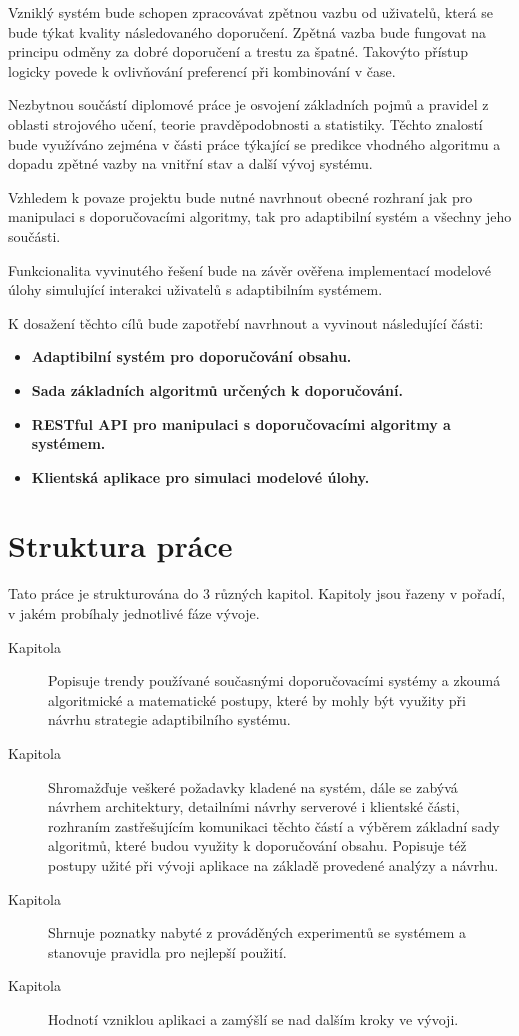 \documentclass[thesis=M,czech]{FITthesis}[2014/05/07]
\begin{document}
\begin{introduction}
	Vzniklý systém bude schopen zpracovávat zpětnou vazbu od uživatelů, která se bude týkat kvality následovaného doporučení. Zpětná vazba bude fungovat na principu odměny za dobré doporučení a trestu za špatné. Takovýto přístup logicky povede k ovlivňování preferencí při kombinování v čase.
		
	Nezbytnou součástí diplomové práce je osvojení základních pojmů a pravidel z oblasti strojového učení, teorie pravděpodobnosti a statistiky. Těchto znalostí bude využíváno zejména v části práce týkající se predikce vhodného algoritmu a dopadu zpětné vazby na vnitřní stav a další vývoj systému. 
	
	Vzhledem k povaze projektu bude nutné navrhnout obecné rozhraní jak pro manipulaci s doporučovacími algoritmy, tak pro adaptibilní systém a všechny jeho součásti.
	
	Funkcionalita vyvinutého řešení bude na závěr ověřena implementací modelové úlohy simulující interakci uživatelů s adaptibilním systémem. 
	
	K dosažení těchto cílů bude zapotřebí navrhnout a vyvinout následující části:

\begin{itemize}
  \item \textbf{Adaptibilní systém pro doporučování obsahu.}
  \item \textbf{Sada základních algoritmů určených k doporučování.}
  \item \textbf{RESTful API pro manipulaci s doporučovacími algoritmy a systémem.}
  \item \textbf{Klientská aplikace pro simulaci modelové úlohy.}  
\end{itemize}	

\section{Struktura práce}
\label{sec:structure}
	Tato práce je strukturována do 3 různých kapitol. Kapitoly jsou řazeny v pořadí, v jakém probíhaly jednotlivé fáze vývoje.	

\begin{description}
  \item[Kapitola ] Popisuje trendy používané současnými doporučovacími systémy a zkoumá algoritmické a matematické postupy, které by mohly být využity při návrhu strategie adaptibilního systému.
  \item[Kapitola ] Shromažďuje veškeré požadavky kladené na systém, dále se zabývá návrhem architektury, detailními návrhy serverové i klientské části, rozhraním zastřešujícím komunikaci těchto částí a výběrem základní sady algoritmů, které budou využity k doporučování obsahu. Popisuje též postupy užité při vývoji aplikace na základě provedené analýzy a návrhu.
  \item[Kapitola ] Shrnuje poznatky nabyté z prováděných experimentů se systémem a stanovuje pravidla pro nejlepší použití.
  \item[Kapitola ] Hodnotí vzniklou aplikaci a zamýšlí se nad dalším kroky ve vývoji.
\end{description}
	

\end{introduction}
\end{document}
